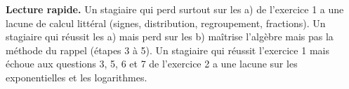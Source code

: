 \documentclass[a4paper,11pt]{article}
\begin{document}
\medskip
\textbf{Lecture rapide.} Un stagiaire qui perd surtout sur les a) de l'exercice 1 a une lacune de calcul littéral (signes, distribution, regroupement, fractions). Un stagiaire qui réussit les a) mais perd sur les b) maîtrise l'algèbre mais pas la méthode du rappel (étapes 3 à 5). Un stagiaire qui réussit l'exercice 1 mais échoue aux questions 3, 5, 6 et 7 de l'exercice 2 a une lacune sur les exponentielles et les logarithmes.
\end{document}
